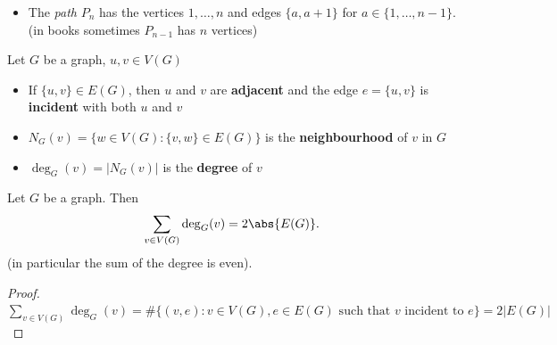\begin{example}
\begin{itemize}
        \item The \emph{path} $P_n$ has the vertices $1, \ldots, n$ and edges $\{a, a+1\}$ for $a \in \{1, \ldots, n-1\}$. (in books sometimes $P_{n-1}$ has $n$ vertices)

        \begin{center}
        \end{center}

    \end{itemize}
\end{example}

\begin{definition}
    Let $G$ be a graph, $u,v\in V(G)$
    \begin{itemize}
        \item If $\{u,v\}\in E(G)$, then $u$ and $v$ are \textbf{adjacent} and the edge $e=\{u,v\}$ is \textbf{incident} with both $u$ and $v$
        \item $N_G(v)=\{w\in V(G):\{v,w\}\in E(G)\}$ is the \textbf{neighbourhood} of $v$ in $G$
        \item $\deg_G(v)=|N_G(v)|$ is the \textbf{degree} of $v$
    \end{itemize}
\end{definition}

\vspace{0.5cm}

\begin{lemma}
    Let $G$ be a graph. Then
    \begin{align}
        \sum\limits_{v \in V(G)} \deg_G(v) = 2 \abs{E(G)}.
    \end{align}
    (in particular the sum of the degree is even).
    
    \begin{proof}
        $\sum\limits_{v\in V(G)} \deg_G(v)=\#\{(v,e):v\in V(G),e\in E(G) \text{ such that } v \text{ incident to } e \}=2|E(G)|$
    \end{proof}
\end{lemma}

